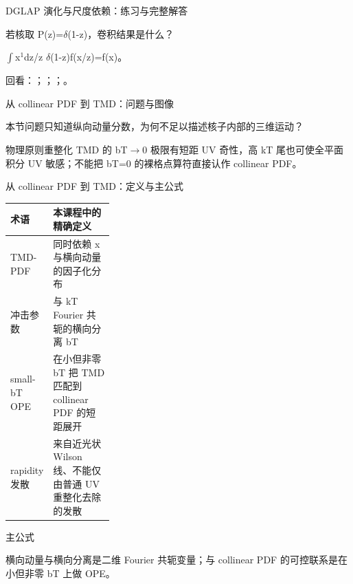 \begin{frame}[t]{DGLAP 演化与尺度依赖：练习与完整解答}
\footnotesize
\begin{block}{}若核取 P(z)=\ensuremath{\delta}(1-z)，卷积结果是什么？\end{block}
\begin{exampleblock}{}\ensuremath{\int}x\ensuremath{^{1}}dz/\allowbreak{}z \ensuremath{\delta}(1-z)f(x/\allowbreak{}z)=f(x)。\end{exampleblock}
\vfill
\scriptsize 回看：；；；。
\end{frame}

\begin{frame}[t]{从 collinear PDF 到 TMD：问题与图像}
\footnotesize
\begin{block}{本节问题}只知道纵向动量分数，为何不足以描述核子内部的三维运动？\end{block}
\begin{block}{物理原则}\quad 重整化 TMD 的 bT\ensuremath{\rightarrow}0 极限有短距 UV 奇性，高 kT 尾也可使全平面积分 UV 敏感；不能把 bT=0 的裸格点算符直接认作 collinear PDF。\end{block}
\end{frame}

\begin{frame}[t]{从 collinear PDF 到 TMD：定义与主公式}
\footnotesize\begin{tabularx}{\linewidth}{p{0.30\linewidth}Y}
\toprule 术语 & 本课程中的精确定义\\\midrule
{} TMD-PDF & 同时依赖 x 与横向动量的因子化分布\\
 冲击参数 & 与 kT Fourier 共轭的横向分离 bT\\
 small-bT OPE & 在小但非零 bT 把 TMD 匹配到 collinear PDF 的短距展开\\
 rapidity 发散 & 来自近光状 Wilson 线、不能仅由普通 UV 重整化去除的发散\\
\bottomrule\end{tabularx}\vspace{0.15cm}
\begin{block}{ 主公式}\centering{}\end{block}
横向动量与横向分离是二维 Fourier 共轭变量；与 collinear PDF 的可控联系是在小但非零 bT 上做 OPE。
\end{frame}

